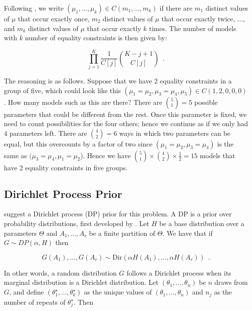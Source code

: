 \documentclass[]{article}
\begin{document}
Following \textcite{gopalan1998bayesian}, we write $(\mu_1, \ldots, \mu_k) \in C(m_1, \ldots, m_k)$ if there are $m_1$ distinct values of $\mu$ that occur exactly once, $m_2$ distinct values of $\mu$ that occur exactly twice, $\ldots$, and $m_k$ distinct values of $\mu$ that occur exactly $k$ times. The number of models with $k$ number of equality constraints is then given by:

\begin{equation}
    \prod_{j = 1}^K \frac{1}{C[j]}{K - j + 1 \choose C[j]} \enspace .
\end{equation}

The reasoning is as follows. Suppose that we have 2 equality constraints in a group of five, which could look like this $(\mu_1 = \mu_2, \mu_3 = \mu_4, \mu_5) \in C(1, 2, 0, 0, 0)$. How many models such as this are there? There are ${5 \choose 1} = 5$ possible parameters that could be different from the rest. Once this parameter is fixed, we need to count possibilities for the four others; hence we continue as if we only had 4 parameters left. There are ${4 \choose 2} = 6$ ways in which two parameters can be equal, but this overcounts by a factor of two since $(\mu_1 = \mu_2, \mu_3 = \mu_4)$ is the same as $(\mu_3 = \mu_4, \mu_1 = \mu_2$). Hence we have ${5 \choose 1} \times {4 \choose 2} \times \frac{1}{2} = 15$ models that have 2 equality constraints in five groups.


\color{red}
\subsection{Dirichlet Process Prior}
\textcite{gopalan1998bayesian} suggest a Dirichlet process (DP) prior for this problem. A DP is a prior over probability distributions, first developed by \textcite{ferguson1973bayesian}. Let $H$ be a base distribution over a parameters $\Theta$ and $A_1, \ldots, A_r$ be a finite partition of $\Theta$. We have that if $G \sim DP(\alpha, H)$ then

\begin{equation}
    G(A_1), \ldots, G(A_r) \sim \text{Dir}(\alpha H(A_1), \ldots, \alpha H(A_r)) \enspace .
\end{equation}

In other words, a random distribution $G$ follows a Dirichlet process when its marginal distribution is a Dirichlet distribution. Let $(\theta_1, \ldots, \theta_n)$ be $n$ draws from $G$, and define $(\theta^{\star}_1, \ldots, \theta^{\star}_k)$ as the unique values of $(\theta_1, \ldots, \theta_n)$ and $n_j$ as the number of repeats of $\theta^{\star}_j$. Then
\end{document}
